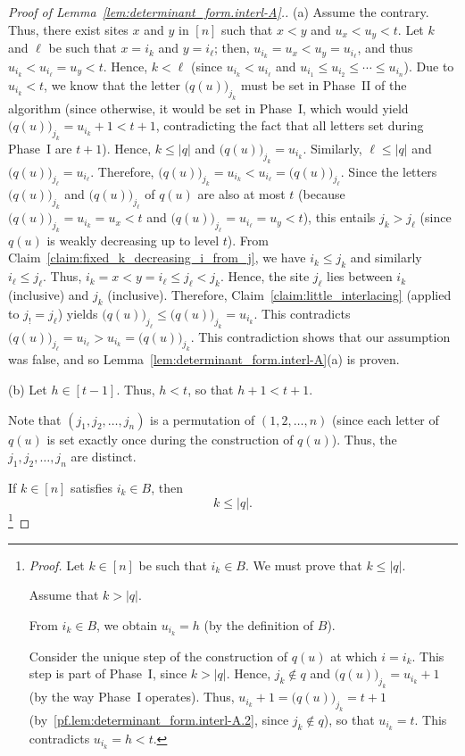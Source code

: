 \documentclass[reqno]{amsart}
\newcommand{\0}{\phantom{c}}
\newcommand{\abs}[1]{\left| #1 \right|}
\newcommand{\tup}[1]{\left( #1 \right)}
\newcommand{\ive}[1]{\left[ #1 \right]}
\theoremstyle{plain}
\theoremstyle{definition}
\numberwithin{equation}{section}
\begin{document}
\begin{proof}[Proof of Lemma~\ref{lem:determinant_form.interl-A}.]
(a) Assume the contrary.
Thus, there exist sites $x$ and $y$ in $\ive{n}$ such that $x<y$ and $u_{x} < u_{y} < t$.
Let $k$ and $\ell $ be such that $x = i_k$ and $y = i_{\ell}$; then, $u_{i_k} = u_{x} < u_{y} = u_{i_{\ell}}$, and thus $u_{i_k} < u_{i_{\ell}} = u_{y} < t$.
Hence, $k < \ell$ (since $u_{i_k} < u_{i_{\ell}}$ and $u_{i_1} \leq u_{i_2} \leq \cdots \leq u_{i_n}$).
Due to $u_{i_k} < t$, we know that the letter $\bigl( q(u) \bigr)_{j_k}$ must be set in Phase~II of the algorithm (since otherwise, it would be set in Phase~I, which would yield $\bigl( q(u) \bigr)_{j_k} = u_{i_k} + 1 < t + 1$, contradicting the fact that all letters set during Phase~I are $t+1$).
Hence, $k \leq \abs{q}$ and $\bigl( q(u) \bigr)_{j_k} = u_{i_k}$.
Similarly, $\ell \leq \abs{q}$ and $\bigl( q(u) \bigr)_{j_{\ell}} = u_{i_{\ell}}$.
Therefore, $\bigl( q(u) \bigr)_{j_k} = u_{i_k} < u_{i_{\ell}} = \bigl( q(u) \bigr)_{j_{\ell}}$.
Since the letters $\bigl( q(u) \bigr) _{j_k}$ and $\bigl( q(u) \bigr)_{j_{\ell}}$ of $q(u)$ are also at most $t$ (because $\bigl( q(u) \bigr)_{j_k} = u_{i_k} = u_{x} < t$ and  $\bigl( q(u) \bigr)_{j_{\ell }} = u_{i_{\ell}} = u_{y} < t$), this entails $j_k > j_{\ell }$ (since $q(u)$ is weakly decreasing up to level $t$).
From Claim~\ref{claim:fixed_k_decreasing_i_from_j}, we have $i_k \leq j_k$ and similarly $i_{\ell} \leq j_{\ell}$.
Thus, $i_k = x < y = i_{\ell} \leq j_{\ell} < j_k$.
Hence, the site $j_{\ell}$ lies between $i_k$ (inclusive) and $j_k$ (inclusive).
Therefore, Claim~\ref{claim:little_interlacing} (applied to $j_{!}=j_{\ell }$) yields $\bigl( q(u) \bigr)_{j_{\ell}} \leq \bigl( q(u) \bigr)_{j_k} = u_{i_k}$.
This contradicts $\bigl( q(u) \bigr)_{j_{\ell}} = u_{i_{\ell }} > u_{i_k} = \bigl( q(u) \bigr)_{j_k}$.
This contradiction shows that our assumption was false, and so Lemma~\ref{lem:determinant_form.interl-A}(a) is proven.

(b) Let $h \in \ive{t-1}$.
Thus, $h < t$, so that $h + 1 < t + 1$.

Note that $\tup{ j_1, j_2, \dotsc, j_n}$ is a permutation of $\tup{1, 2, \dotsc, n}$ (since each letter of $q(u) $ is set exactly once during the construction of $q(u)$).
Thus, the $j_1, j_2, \dotsc, j_n$ are distinct.

If $k\in \ive{n} $ satisfies $i_k\in B$, then
\begin{equation}
\label{pf.lem:determinant_form.interl-A.b.1}
k \leq \abs{q}.
\end{equation}
\footnote{\textit{Proof.} Let $k \in \ive{n} $ be such that $i_k\in B$.
We must prove that $k \leq \abs{q}$.
\par
Assume that $k > \abs{q}$.
\par
From $i_k\in B$, we obtain $u_{i_k}=h$ (by the definition of $B$).
\par
Consider the unique step of the construction of $q(u) $ at which $i = i_k$.
This step is part of Phase~I, since $k > \abs{q}$.
Hence, $j_k \notin q$ and $\bigl( q(u) \bigr)_{j_k} = u_{i_k}+1$ (by the way Phase~I operates).
Thus, $u_{i_k}+1 = \bigl( q(u) \bigr)_{j_k} = t+1$ (by~\eqref{pf.lem:determinant_form.interl-A.2}, since $j_k\notin q$), so that $u_{i_k} = t$.
This contradicts $u_{i_k} = h < t$.}


\end{proof}
\end{document}
